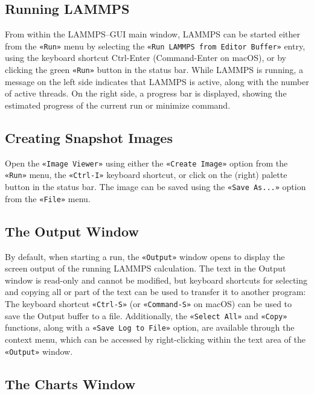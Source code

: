 \documentclass[9pt,tutorial]{livecoms}
\newcommand{\lmpcmd}[1]{\hspace{0pt}\colorbox{listing}{\textcolor{command}{\small{#1}}}\hspace{0pt}} %
\newcommand{\guicmd}[1]{\textcolor{command}{\texttt{«#1»}}} %
\begin{document}
\begin{appendices}
\subsection{Running LAMMPS}


From within the LAMMPS--GUI main window, LAMMPS can be started either from
the \guicmd{Run} menu by selecting the \guicmd{Run LAMMPS from Editor Buffer} entry,
using the keyboard shortcut Ctrl-Enter (Command-Enter on macOS), or by clicking the
green \guicmd{Run} button in the status bar.  While LAMMPS is running, a message on
the left side indicates that LAMMPS is active, along with the number of active threads.
On the right side, a progress bar is displayed, showing the estimated progress
of the current \lmpcmd{run} or \lmpcmd{minimize} command.

\subsection{Creating Snapshot Images}

Open the \guicmd{Image Viewer} using either the \guicmd{Create Image} option
from the \guicmd{Run} menu, the \guicmd{Ctrl-I} keyboard shortcut,
or click on the (right) palette button in the status bar.  The image
can be saved using the \guicmd{Save As...} option from the \guicmd{File} menu.

\subsection{The Output Window}

By default, when starting a run, the \guicmd{Output} window opens to display the screen
output of the running LAMMPS calculation.  The text in the Output window is
read-only and cannot be modified, but keyboard shortcuts for selecting and
copying all or part of the text can be used to transfer it to another program:
The keyboard shortcut \guicmd{Ctrl-S} (or \guicmd{Command-S} on {macOS}) can
be used to save the Output buffer to a file.  Additionally, the \guicmd{Select All}
and \guicmd{Copy} functions, along with a \guicmd{Save Log to File} option, are available
through the context menu, which can be accessed by right-clicking within the text area of the
\guicmd{Output} window.

\subsection{The Charts Window}


\end{appendices}
\end{document}
